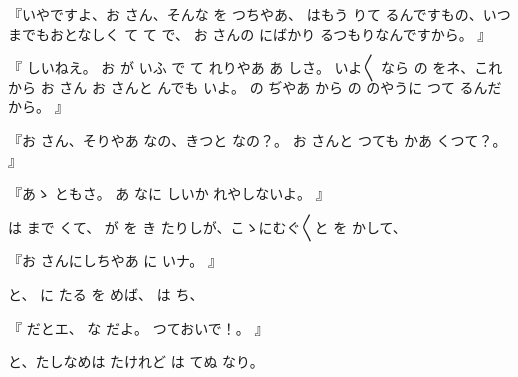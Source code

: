 『いやですよ、お
さん、そんな
を
つちやあ、
はもう
りて
るんですもの、いつまでもおとなしく
て
て
で、
お
さんの
にばかり
るつもりなんですから。
』

『
しいねえ。
お
が
いふ
で
て
れりやあ
あ
しさ。
いよ〳〵
なら
の
をネ、これから
お
さん
お
さんと
んでも
いよ。
の
ぢやあ
から
の
のやうに
つて
るんだから。
』

『お
さん、そりやあ
なの、きつと
なの？。
お
さんと
つても
かあ
くつて？。
』

『あゝ
ともさ。
あ
なに
しいか
れやしないよ。
』

は
まで
くて、
が
を
き
たりしが、こゝにむぐ〳〵と
を
かして、

『お
さんにしちやあ
に
いナ。
』

と、
に
たる
を
めば、
は
ち、

『
だとエ、
な
だよ。
つておいで！。
』

と、たしなめは
たけれど
は
てぬ
なり。

